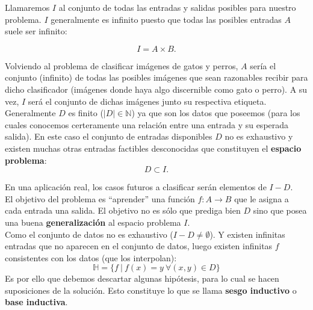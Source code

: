     
Llamaremos $I$ al conjunto de todas las entradas y salidas posibles para nuestro problema. $I$ generalmente es infinito puesto que todas las posibles entradas $A$ suele ser infinito:

\begin{equation*}
    I = A \times B.
\end{equation*}

Volviendo al problema de clasificar imágenes de gatos y perros, $A$ sería el conjunto (infinito) de todas las posibles imágenes que sean razonables recibir para dicho clasificador (imágenes donde haya algo discernible como gato o perro). A su vez, $I$ será el conjunto de dichas imágenes junto su respectiva etiqueta.\\

Generalmente $D$ es finito ($|D| \in \mathbb{N} $) ya que son los datos que poseemos (para los cuales conocemos certeramente una relación entre una entrada y su esperada salida). En este caso el conjunto de entradas disponibles $D$ no es exhaustivo y existen muchas otras entradas factibles desconocidas que constituyen el \textbf{espacio problema}:
\begin{equation*}
    D \subset I.
\end{equation*}

En una aplicación real, los casos futuros a clasificar serán elementos de $I - D$.\\

El objetivo del problema es ``aprender'' una función $f : A \rightarrow B$ que le asigna a cada entrada una salida. El objetivo no es sólo que prediga bien $D$ sino que posea una buena \textbf{generalización} al espacio problema $I$.\\

Como el conjunto de datos no es exhaustivo ($I - D \neq \emptyset$). Y existen infinitas entradas que no aparecen en el conjunto de datos, luego existen infinitas $f$ consistentes con los datos (que los interpolan):
\begin{equation*}
    \mathbb{H} = \{ f~|~f(x)=y ~\forall (x,y) \in D \}
\end{equation*}
Es por ello que debemos descartar algunas hipótesis, para lo cual se hacen suposiciones de la solución. Esto constituye lo que se llama \textbf{sesgo inductivo} o \textbf{base inductiva}.  \\

